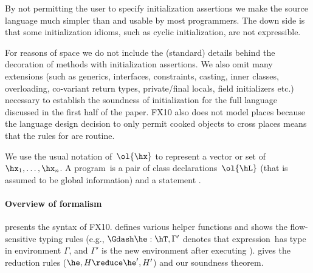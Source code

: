 
By not permitting the user to specify initialization assertions we
make the source language much simpler than \cite{XinQi:2009} and
usable by most programmers. The down side is that some initialization
idioms, such as cyclic initialization, are not expressible. 

For reasons of space we do not include the (standard) details behind
the decoration of methods with initialization assertions. We also omit
many extensions (such as generics, interfaces, constraints, casting,
inner classes, overloading, co-variant return types, private/final
locals, field initializers etc.) necessary to establish the soundness
of initialization for the full language discussed in the first half of
the paper. FX10 also does not model places because the language design
decision to only permit cooked objects to cross places means that the
rules for  are routine. 

We use the usual notation of~$\ol{\hx}$ to represent a vector or set of~$\hx_1, \ldots,\hx_n$.
A program~\hP is a pair of class declarations~$\ol{\hL}$ (that is assumed to be global information)
    and a statement \hS.

\paragraph{Overview of formalism}
 presents the syntax of FX10.
 defines various helper functions and shows the flow-sensitive typing rules
    (e.g., $\Gdash \he:\hT, \Gamma'$ denotes that expression~\he has type \hT in environment $\Gamma$, and $\Gamma'$ is the new environment after executing \he).
 gives the reduction rules ($\he,H \reduce \he',H'$) and our soundness theorem.



